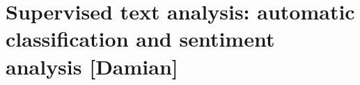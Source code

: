 \section{Supervised text analysis: automatic classification and sentiment analysis [Damian]}
\label{sec:supervised}
